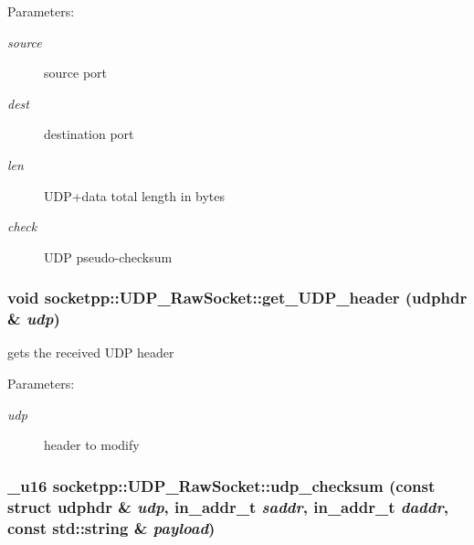 \begin{Desc}
\item[Parameters:]
\begin{description}
\item[{\em source}]source port \item[{\em dest}]destination port \item[{\em len}]UDP+data total length in bytes \item[{\em check}]UDP pseudo-checksum \end{description}
\end{Desc}
\hypertarget{classsocketpp_1_1UDP__RawSocket_597a30fc537dce06c85663add29defdc}{
\subsubsection[{get\_\-UDP\_\-header}]{\setlength{\rightskip}{0pt plus 5cm}void socketpp::UDP\_\-RawSocket::get\_\-UDP\_\-header (udphdr \& {\em udp})}}
\label{classsocketpp_1_1UDP__RawSocket_597a30fc537dce06c85663add29defdc}


gets the received UDP header 

\begin{Desc}
\item[Parameters:]
\begin{description}
\item[{\em udp}]header to modify \end{description}
\end{Desc}
\hypertarget{classsocketpp_1_1UDP__RawSocket_331a9aa1b1bc9aa16a25954061c04551}{
\subsubsection[{udp\_\-checksum}]{\setlength{\rightskip}{0pt plus 5cm}\_\-u16 socketpp::UDP\_\-RawSocket::udp\_\-checksum (const struct udphdr \& {\em udp}, \/  in\_\-addr\_\-t {\em saddr}, \/  in\_\-addr\_\-t {\em daddr}, \/  const std::string \& {\em payload})}}
\label{classsocketpp_1_1UDP__RawSocket_331a9aa1b1bc9aa16a25954061c04551}


